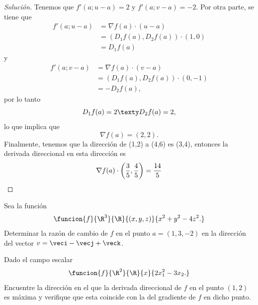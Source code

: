 \documentclass[a4,11pt]{aleph-notas}
\begin{document}
\begin{proof}[Solución]
Tenemos que $f'(a;u-a)=2$ y $f'(a;v-a)=-2$. Por otra parte, se tiene que
    \begin{align*}
        f'(a;u-a) 
            & = \nabla f(a) \cdot (u-a) \\
            & = (D_1f(a),D_2f(a))\cdot (1,0) \\
            & = D_1f(a)
    \end{align*}
    y
    \begin{align*}
        f'(a;v-a) 
            & = \nabla f(a) \cdot (v-a) \\
            & = (D_1f(a),D_2f(a))\cdot (0,-1) \\
            & = -D_2f(a),
    \end{align*}
    por lo tanto
    \[
        D_1f(a)=2
        \texty
        D_2f(a)=2,
    \]
    lo que implica que
    \[
        \nabla f(a)=(2,2). 
    \]
    Finalmente, tenemos que la dirección de (1,2) a (4,6) es (3,4), entonces la derivada direccional en esta dirección es
    \[
        \nabla f(a) \cdot \left( \frac{3}{5},\frac{4}{5} \right)=\frac{14}{5} \qedhere
    \]
\end{proof}

\begin{ejer}
Sea la función
   		\[
            \funcion{f}{\R^3}{\R}{(x,y,z)}{x^2+y^2-4z^2.}
        \]
    Determinar la razón de cambio de $f$ en el punto $a=(1,3,-2)$ en la dirección del vector $v=\veci-\vecj+\veck$.
\end{ejer}

\begin{ejer}
Dado el campo escalar
	\[
		\funcion{f}{\R^2}{\R}{x}{2x_1^2-3x_2.}
	\]
	Encuentre la dirección en el que la derivada direccional de $f$ en el punto $(1,2)$ es máxima y verifique que esta coincide con la del gradiente de $f$ en dicho punto.
\end{ejer}
\end{document}
